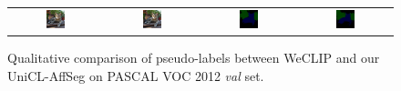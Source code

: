 \begin{figure}[ht]
\begin{tabular}{cccc}
    \includegraphics[width=0.22\textwidth]
    {figures/originals/2007_003778.jpg}
              &
    \includegraphics[width=0.22\textwidth]
    {figures/originals/2007_003778.jpg}
              &
    \includegraphics[width=0.22\textwidth]
    {figures/val_labels/weclip/2007_003778_[7, 15].png}
              &
    \includegraphics[width=0.22\textwidth]
    {figures/val_labels/ours/2007_003778_[7, 15].png}  \\
  \end{tabular}

  \caption{Qualitative comparison of pseudo-labels between WeCLIP and our UniCL-AffSeg on PASCAL VOC 2012 \textit{val} set.}
  \label{fig:qualitative_comparison_pseudolabel_val}
\end{figure}





